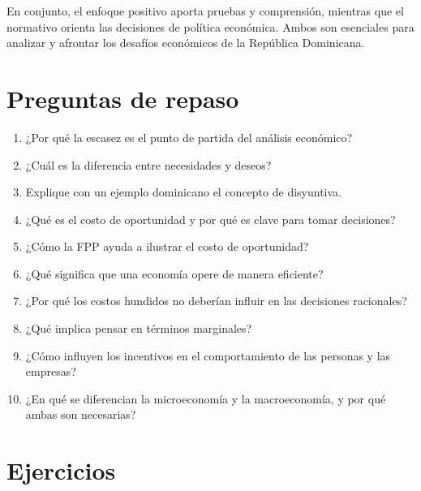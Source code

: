 \documentclass[
  letterpaper,
  DIV=11,
  numbers=noendperiod,
  oneside]{scrreprt}
\begin{document}
En conjunto, el enfoque positivo aporta pruebas y comprensión, mientras
que el normativo orienta las decisiones de política económica. Ambos son
esenciales para analizar y afrontar los desafíos económicos de la
República Dominicana.

\section*{Preguntas de repaso}\label{preguntas-de-repaso}


\begin{enumerate}
\def\labelenumi{\arabic{enumi}.}
\item
  ¿Por qué la escasez es el punto de partida del análisis económico?
\item
  ¿Cuál es la diferencia entre necesidades y deseos?
\item
  Explique con un ejemplo dominicano el concepto de disyuntiva.
\item
  ¿Qué es el costo de oportunidad y por qué es clave para tomar
  decisiones?
\item
  ¿Cómo la FPP ayuda a ilustrar el costo de oportunidad?
\item
  ¿Qué significa que una economía opere de manera eficiente?
\item
  ¿Por qué los costos hundidos no deberían influir en las decisiones
  racionales?
\item
  ¿Qué implica pensar en términos marginales?
\item
  ¿Cómo influyen los incentivos en el comportamiento de las personas y
  las empresas?
\item
  ¿En qué se diferencian la microeconomía y la macroeconomía, y por qué
  ambas son necesarias?
\end{enumerate}

\section*{Ejercicios}\label{ejercicios}

\end{document}
